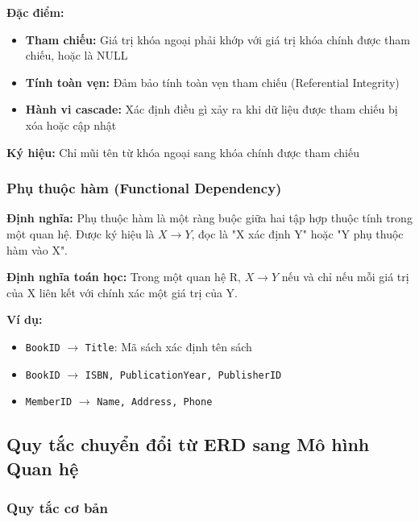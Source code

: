 \documentclass[12pt,a4paper]{article}
\begin{document}
\textbf{Đặc điểm:}
\begin{itemize}
    \item \textbf{Tham chiếu:} Giá trị khóa ngoại phải khớp với giá trị khóa chính được tham chiếu, hoặc là NULL
    \item \textbf{Tính toàn vẹn:} Đảm bảo tính toàn vẹn tham chiếu (Referential Integrity)
    \item \textbf{Hành vi cascade:} Xác định điều gì xảy ra khi dữ liệu được tham chiếu bị xóa hoặc cập nhật
\end{itemize}

\textbf{Ký hiệu:} Chỉ mũi tên từ khóa ngoại sang khóa chính được tham chiếu

\subsubsection{Phụ thuộc hàm (Functional Dependency)}

\textbf{Định nghĩa:} Phụ thuộc hàm là một ràng buộc giữa hai tập hợp thuộc tính trong một quan hệ. Được ký hiệu là $X \rightarrow Y$, đọc là "X xác định Y" hoặc "Y phụ thuộc hàm vào X".

\textbf{Định nghĩa toán học:} Trong một quan hệ R, $X \rightarrow Y$ nếu và chỉ nếu mỗi giá trị của X liên kết với chính xác một giá trị của Y.

\textbf{Ví dụ:}
\begin{itemize}
    \item \texttt{BookID} $\rightarrow$ \texttt{Title}: Mã sách xác định tên sách
    \item \texttt{BookID} $\rightarrow$ \texttt{ISBN, PublicationYear, PublisherID}
    \item \texttt{MemberID} $\rightarrow$ \texttt{Name, Address, Phone}
\end{itemize}

\subsection{Quy tắc chuyển đổi từ ERD sang Mô hình Quan hệ}

\subsubsection{Quy tắc cơ bản}
\end{document}
